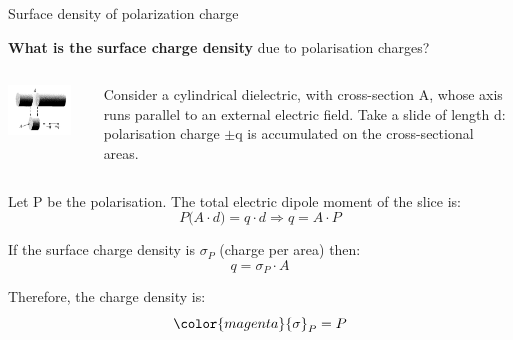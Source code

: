%
%
%

\begin{frame}{Surface density of polarization charge}

{\bf What is the surface charge density} due to polarisation charges?\\

\begin{columns}
  \begin{column}{0.35\textwidth}
   \begin{center}
     \includegraphics[width=0.85\textwidth]{./images/schematics/polarisation_surface_charge_density_1.png}\\
   \end{center}
  \end{column}
  \begin{column}{0.65\textwidth}
      Consider a cylindrical dielectric, with cross-section A,
      whose axis runs parallel to an external electric field.
      Take a slide of length d: polarisation charge $\pm$q is
      accumulated on the cross-sectional areas.\\
  \end{column}
\end{columns}

Let P be the polarisation. The total electric dipole moment of the slice is:
\begin{equation*}
  P \Big( A \cdot d \Big) = q \cdot d \Rightarrow q = A \cdot P
\end{equation*}

If the surface charge density is ${\sigma}_P$ (charge per area) then:
\begin{equation*}
  q = {\sigma}_P \cdot A
\end{equation*}

Therefore, the charge density is:
\begin{equation*}
  {\color{magenta} {\sigma}_P = P}
\end{equation*}

\end{frame}

